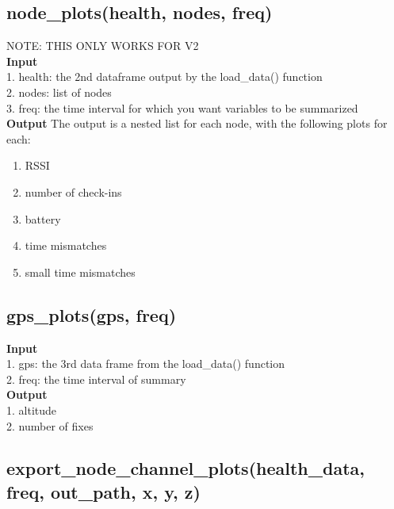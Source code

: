 \documentclass[
]{book}
\providecommand{\tightlist}{%
  \setlength{\itemsep}{0pt}\setlength{\parskip}{0pt}}
\begin{document}
\hypertarget{node_plotshealth-nodes-freq}{%
\subsection{node\_plots(health, nodes, freq)}\label{node_plotshealth-nodes-freq}}

NOTE: THIS ONLY WORKS FOR V2\\
\textbf{Input}\\
1. health: the 2nd dataframe output by the load\_data() function\\
2. nodes: list of nodes\\
3. freq: the time interval for which you want variables to be summarized\\
\textbf{Output} The output is a nested list for each node, with the following plots for each:

\begin{enumerate}
\def\labelenumi{\arabic{enumi}.}
\tightlist
\item
  RSSI\\
\item
  number of check-ins\\
\item
  battery\\
\item
  time mismatches\\
\item
  small time mismatches
\end{enumerate}

\hypertarget{gps_plotsgps-freq}{%
\subsection{gps\_plots(gps, freq)}\label{gps_plotsgps-freq}}

\textbf{Input}\\
1. gps: the 3rd data frame from the load\_data() function\\
2. freq: the time interval of summary\\
\textbf{Output}\\
1. altitude\\
2. number of fixes

\hypertarget{export_node_channel_plotshealth_data-freq-out_path-x-y-z}{%
\subsection{export\_node\_channel\_plots(health\_data, freq, out\_path, x, y, z)}\label{export_node_channel_plotshealth_data-freq-out_path-x-y-z}}
\end{document}
